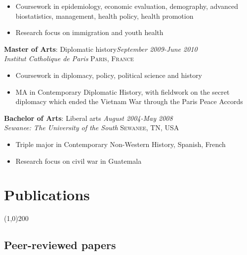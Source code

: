 \documentclass[11pt]{article}
\begin{document}
\vspace{-2mm}
\begin{itemize}\itemsep0pt \parskip0pt 
\item Coursework in epidemiology, economic evaluation, demography, advanced biostatistics, management, health policy, health promotion
\item Research focus on immigration and youth health 
\end{itemize}


\noindent \textbf{Master of Arts}: Diplomatic history\hfill \emph{September 2009-June 2010}\\
\noindent \emph{Institut Catholique de Paris} \hfill \textsc{Paris, France}
\vspace{-2mm}
\begin{itemize}\itemsep0pt \parskip0pt 
\item Coursework in diplomacy, policy, political science and history
\item MA in Contemporary Diplomatic History, with fieldwork on the secret diplomacy which ended the Vietnam War through the Paris Peace Accords
\end{itemize}

\noindent \textbf{Bachelor of Arts}: Liberal arts \hfill \emph{August 2004-May 2008}\\
\noindent \emph{Sewanee: The University of the South} \hfill \textsc{Sewanee, TN, USA}
\vspace{-2mm}
\begin{itemize}\itemsep0pt \parskip0pt 
\item Triple major in Contemporary Non-Western History, Spanish, French
\item Research focus on civil war in Guatemala
\end{itemize}


\newpage

\section*{Publications} %
\vspace{-7mm}
\line(1,0){200}
\vspace{2mm}


\subsection*{Peer-reviewed papers}
\end{document}
